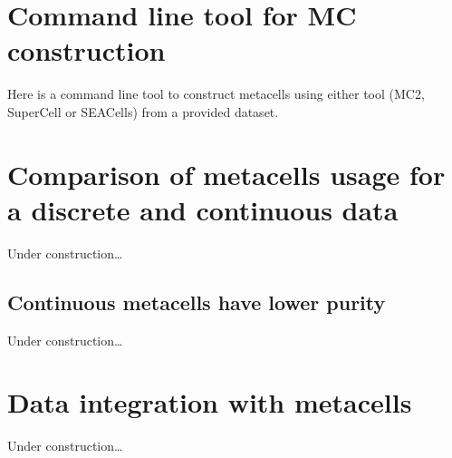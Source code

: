 \documentclass[
]{book}
\begin{document}
\hypertarget{command-line-tool-for-mc-construction}{%
\chapter{Command line tool for MC construction}\label{command-line-tool-for-mc-construction}}

Here is a command line tool to construct metacells using either tool (MC2, SuperCell or SEACells) from a provided dataset.

\hypertarget{comparison-of-metacells-usage-for-a-discrete-and-continuous-data}{%
\chapter{Comparison of metacells usage for a discrete and continuous data}\label{comparison-of-metacells-usage-for-a-discrete-and-continuous-data}}

Under construction\ldots{}

\hypertarget{continuous-metacells-have-lower-purity}{%
\section{Continuous metacells have lower purity}\label{continuous-metacells-have-lower-purity}}

Under construction\ldots{}

\hypertarget{data-integration-with-metacells}{%
\chapter{Data integration with metacells}\label{data-integration-with-metacells}}

Under construction\ldots{}

  
\end{document}

